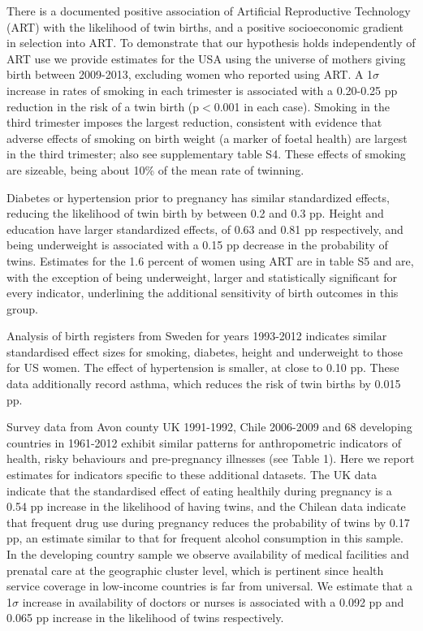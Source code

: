\documentclass[11pt]{article}
\begin{document}
There is a documented positive association of Artificial Reproductive Technology (ART) with the likelihood of twin births\cite{Vitthalaetal2009}, and a positive socioeconomic gradient in selection into ART. To demonstrate that our hypothesis holds independently of ART use we provide estimates for the USA using the universe of mothers giving birth between 2009-2013, excluding women who reported using ART. A 1$\sigma$ increase in rates of smoking in each trimester is associated with a 0.20-0.25 pp reduction in the risk of a twin birth (p$<$0.001 in each case). Smoking in the third trimester imposes the largest reduction, consistent with evidence that adverse effects of smoking on birth weight (a marker of foetal health) are largest in the third trimester\cite{Bernsteinetal2005}; also see supplementary table S4.  These effects of smoking are sizeable, being about 10\% of the mean rate of twinning. 

Diabetes or hypertension prior to pregnancy has similar standardized effects, reducing the likelihood of twin birth by between 0.2 and 0.3 pp. Height and education have larger standardized effects, of 0.63 and 0.81 pp respectively, and being underweight is associated with a 0.15 pp decrease in the probability of twins. Estimates for the 1.6 percent of women using ART are in table S5 and are, with the exception of being underweight, larger and statistically significant for every indicator, underlining the additional sensitivity of birth outcomes in this group.

Analysis of birth registers from Sweden for years 1993-2012 indicates similar standardised effect sizes for smoking, diabetes, height and underweight to those for US women. The effect of hypertension is smaller, at close to 0.10 pp. These data additionally record asthma, which reduces the risk of twin births by 0.015 pp.


Survey data from Avon county UK 1991-1992, Chile 2006-2009 and 68 developing countries in 1961-2012 exhibit similar patterns for anthropometric indicators of health, risky behaviours and pre-pregnancy illnesses (see Table 1). Here we report estimates for indicators specific to these additional datasets. The UK data indicate that the standardised effect of eating healthily during pregnancy is a 0.54 pp increase in the likelihood of having twins, and the Chilean data indicate that frequent drug use during pregnancy reduces the probability of twins by 0.17 pp, an estimate similar to that for frequent alcohol consumption in this sample. In the developing country sample we observe availability of medical facilities and prenatal care at the geographic cluster level, which is pertinent since health service coverage in low-income countries is far from universal. We estimate that a 1$\sigma$ increase in  availability of doctors or nurses is associated with a 0.092 pp and 0.065 pp increase in the likelihood of twins respectively. 
\end{document}
